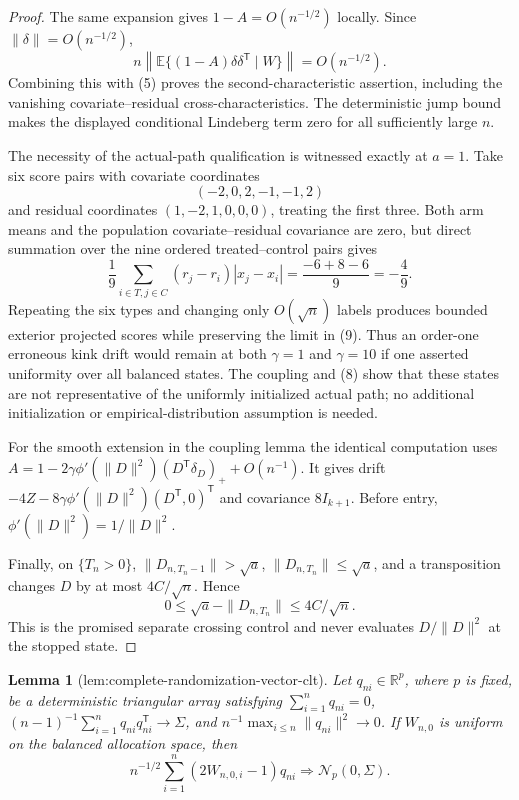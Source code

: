 \documentclass{article}
\newtheorem{lemma}{Lemma}
\begin{document}
\begin{proof}
The same expansion gives \(1-A=O(n^{-1/2})\) locally.  Since \(\|\delta\|=O(n^{-1/2})\),
\[
 n\left\|\mathbb E\{(1-A)\delta\delta^{\mathsf T}\mid W\}\right\|=O(n^{-1/2}).
\]
Combining this with (5) proves the second-characteristic assertion, including the vanishing covariate--residual cross-characteristics.  The deterministic jump bound makes the displayed conditional Lindeberg term zero for all sufficiently large \(n\).

The necessity of the actual-path qualification is witnessed exactly at \(a=1\).  Take six score pairs with covariate coordinates
\[
 (-2,0,2,-1,-1,2)
\]
and residual coordinates \((1,-2,1,0,0,0)\), treating the first three.  Both arm means and the population covariate--residual covariance are zero, but direct summation over the nine ordered treated--control pairs gives
\[
 \frac19\sum_{i\in T,j\in C}(r_j-r_i)|x_j-x_i|=\frac{-6+8-6}{9}=-\frac49. \tag{9}
\]
Repeating the six types and changing only \(O(\sqrt n)\) labels produces bounded exterior projected scores while preserving the limit in (9).  Thus an order-one erroneous kink drift would remain at both \(\gamma=1\) and \(\gamma=10\) if one asserted uniformity over all balanced states.  The coupling and (8) show that these states are not representative of the uniformly initialized actual path; no additional initialization or empirical-distribution assumption is needed.

For the smooth extension in the coupling lemma the identical computation uses
\(A=1-2\gamma\phi'(\|D\|^2)(D^{\mathsf T}\delta_D)_++O(n^{-1})\).  It gives drift \(-4Z-8\gamma\phi'(\|D\|^2)(D^{\mathsf T},0)^{\mathsf T}\) and covariance \(8I_{k+1}\).  Before entry, \(\phi'(\|D\|^2)=1/\|D\|^2\).

Finally, on \(\{T_n>0\}\), \(\|D_{n,T_n-1}\|>\sqrt a\), \(\|D_{n,T_n}\|\le\sqrt a\), and a transposition changes \(D\) by at most \(4C/\sqrt n\).  Hence
\[
 0\le\sqrt a-\|D_{n,T_n}\|\le4C/\sqrt n.
\]
This is the promised separate crossing control and never evaluates \(D/\|D\|^2\) at the stopped state.
\end{proof}

\begin{lemma}[lem:complete-randomization-vector-clt]\label{lem:complete-randomization-vector-clt}
Let \(q_{ni}\in\mathbb R^p\), where \(p\) is fixed, be a deterministic triangular array satisfying \(\sum_{i=1}^n q_{ni}=0\), \((n-1)^{-1}\sum_{i=1}^nq_{ni}q_{ni}^{\mathsf T}\to\Sigma\), and \(n^{-1}\max_{i\le n}\|q_{ni}\|^2\to0\).  If \(W_{n,0}\) is uniform on the balanced allocation space, then
\[
 n^{-1/2}\sum_{i=1}^n(2W_{n,0,i}-1)q_{ni}\Rightarrow\mathcal N_p(0,\Sigma).
\]
\end{lemma}
\end{document}
